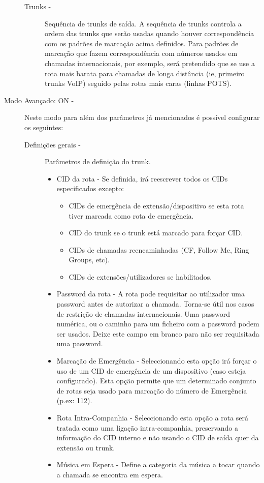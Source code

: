 \begin{description}
\begin{description}
            \item[Trunks -] Sequência de trunks de saída. A sequência de trunks controla a ordem das trunks que serão usadas quando houver correspondência com os padrões de marcação acima definidos.
                            Para padrões de marcação que fazem correspondência com números usados em chamadas internacionais, por exemplo, será pretendido que se use a rota mais barata para chamadas de longa distância (ie, primeiro trunks VoIP) seguido pelas rotas mais caras (linhas POTS).
        \end{description}
	\item[Modo Avançado: ON -] Neste modo para além dos parâmetros já mencionados é possível configurar os seguintes:
        \begin{description}
            \item[Definições gerais -] Parâmetros de definição do trunk.
                \begin{itemize}
                    \item CID da rota - Se definida, irá reescrever todos os CIDs especificados excepto:
                        \begin{itemize}
                            \item CIDs de emergência de extensão/dispositivo se esta rota tiver marcada como rota de emergência.
                            \item CID do trunk se o trunk está marcado para forçar CID.
                            \item CIDs de chamadas reencaminhadas (CF, Follow Me, Ring Groups, etc).
                            \item CIDs de extensões/utilizadores se habilitados.
                        \end{itemize}                       
                    \item Password da rota - A rota pode requisitar ao utilizador uma password antes de autorizar a chamada. Torna-se útil nos casos de restrição de chamadas internacionais.
                                             Uma password numérica, ou o caminho para um ficheiro com a password podem ser usados. Deixe este campo em branco para não ser requisitada uma password.
                    \item Marcação de Emergência - Seleccionando esta opção irá forçar o uso de um CID de emergência de um dispositivo (caso esteja configurado). Esta opção permite que um determinado conjunto de rotas seja usado para marcação do número de Emergência (p.ex: 112).
                    \item Rota Intra-Companhia - Seleccionando esta opção a rota será tratada como uma ligação intra-companhia, preservando a informação do CID interno e não usando o CID de saída quer da extensão ou trunk.
                    \item Música em Espera - Define a categoria da música a tocar quando a chamada se encontra em espera.
                \end{itemize}            
        \end{description}
\end{description}


